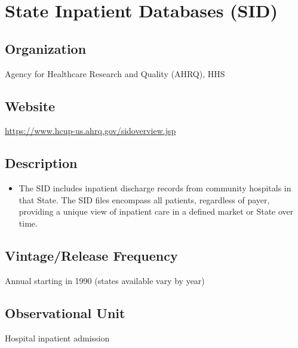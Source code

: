 \documentclass[
]{book}
\providecommand{\tightlist}{%
  \setlength{\itemsep}{0pt}\setlength{\parskip}{0pt}}
\begin{document}
\mainmatter

\hypertarget{state-inpatient-databases-sid}{%
\chapter{State Inpatient Databases (SID)}\label{state-inpatient-databases-sid}}

\hypertarget{organization-85}{%
\section{Organization}\label{organization-85}}

Agency for Healthcare Research and Quality (AHRQ), HHS

\hypertarget{website-85}{%
\section{Website}\label{website-85}}

\url{https://www.hcup-us.ahrq.gov/sidoverview.jsp}

\hypertarget{description-85}{%
\section{Description}\label{description-85}}

\begin{itemize}
\tightlist
\item
  The SID includes inpatient discharge records from community hospitals in that State. The SID files encompass all patients, regardless of payer, providing a unique view of inpatient care in a defined market or State over time.
\end{itemize}

\hypertarget{vintagerelease-frequency-85}{%
\section{Vintage/Release Frequency}\label{vintagerelease-frequency-85}}

Annual starting in 1990 (states available vary by year)

\hypertarget{observational-unit-85}{%
\section{Observational Unit}\label{observational-unit-85}}

Hospital inpatient admission
\end{document}
